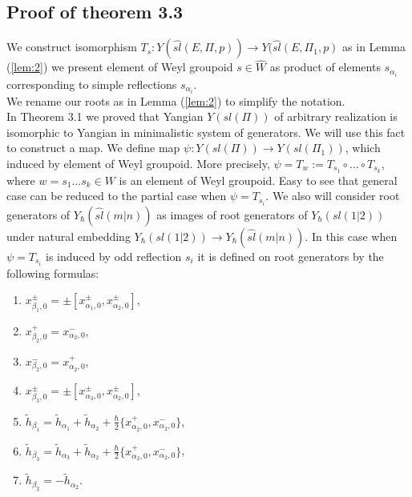 \documentclass[english]{elsarticle}
\numberwithin{equation}{section}
\begin{document}
\subsection{Proof of theorem 3.3}

We construct isomorphism $T_s:Y(\hat{sl}(E,\Pi,p))\rightarrow Y(\hat{sl}(E,\Pi_1,p)$
as in Lemma (\ref{lem:2}) we present element of Weyl groupoid $s \in \hat{W}$ as product of elements $s_{\alpha_i}$ corresponding to simple reflections $s_{\alpha_i}$.\\
We rename our roots as in Lemma (\ref{lem:2}) to simplify the notation.\\
In Theorem 3.1 we proved that Yangian $Y(sl(\Pi))$ of arbitrary realization is isomorphic to Yangian in minimalistic system of generators. We will use this fact to construct a map.
We define map $\psi:Y(sl(\Pi))\rightarrow Y(sl(\Pi_1))$, which induced by element of Weyl groupoid. More precisely, $\psi = T_w := T_{s_1}\circ \ldots \circ T_{s_k}$, where $w = s_1 \ldots s_k \in W$ is an element of Weyl groupoid.  Easy to see that general case can be reduced to the partial case when $\psi= T_{s_i}$.  We also will consider root generators of $Y_{\hbar}(\hat{sl}(m|n))$ as images of root generators of $Y_{\hbar}(sl(1|2))$ under natural embedding $Y_{\hbar}(sl(1|2)) \rightarrow Y_{\hbar}(\hat{sl}(m|n))$.  In this case when $\psi= T_{s_i}$ is induced by odd reflection $s_i$ it is defined on root generators  by the following formulas:
\begin{enumerate}
\item $x_{\beta_1,0}^{\pm}=\pm[x_{\alpha_1,0}^{\pm},x_{\alpha_2,0}^{\pm}]$,
\item $x_{\beta_2,0}^+=x_{\alpha_2,0}^-$,
\item $x_{\beta_2,0}^-=x_{\alpha_2,0}^+$,
\item $x_{\beta_3,0}^{\pm}=\pm[x_{\alpha_3,0}^{\pm},x_{\alpha_2,0}^{\pm}]$,
\item $\tilde{h}_{\beta_1}=\tilde{h}_{\alpha_1}+\tilde{h}_{\alpha_2}+ \frac{\hbar}{2}\{x_{\alpha_{2},0}^{+},x_{\alpha_{2},0}^{-}\}$,
\item $\tilde{h}_{\beta_3}=\tilde{h}_{\alpha_3}+\tilde{h}_{\alpha_2}+ \frac{\hbar}{2}\{x_{\alpha_{2},0}^{+},x_{\alpha_{2},0}^{-}\}$,
\item $\tilde{h}_{\beta_2}=-\tilde{h}_{\alpha_2}$.
\end{enumerate}

\end{document}
